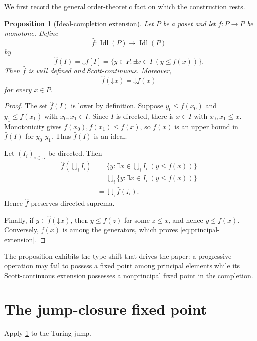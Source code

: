 \documentclass[11pt]{article}
\newtheorem{proposition}[theorem]{Proposition}
\theoremstyle{definition}
\theoremstyle{remark}
\newcommand{\Idl}{\operatorname{Idl}}
\newcommand{\down}{\mathord{\downarrow}}
\begin{document}
We first record the general order-theoretic fact on which the construction rests.

\begin{proposition}[Ideal-completion extension]
\label{prop:ideal-extension}
Let $P$ be a poset and let $f:P\to P$ be monotone. Define
\[
\widehat f:\Idl(P)\to\Idl(P)
\]
by
\begin{equation}
\widehat f(I)
=\down f[I]
=\{y\in P:\exists x\in I\ (y\leq f(x))\}.
\label{eq:ideal-extension}
\end{equation}
Then $\widehat f$ is well defined and Scott-continuous. Moreover,
\begin{equation}
\widehat f(\down x)=\down f(x)
\label{eq:principal-extension}
\end{equation}
for every $x\in P$.
\end{proposition}

\begin{proof}
The set $\widehat f(I)$ is lower by definition. Suppose
$y_0\leq f(x_0)$ and $y_1\leq f(x_1)$ with $x_0,x_1\in I$. Since $I$ is directed, there is $x\in I$ with $x_0,x_1\leq x$. Monotonicity gives $f(x_0),f(x_1)\leq f(x)$, so $f(x)$ is an upper bound in $\widehat f(I)$ for $y_0,y_1$. Thus $\widehat f(I)$ is an ideal.

Let $(I_i)_{i\in D}$ be directed. Then
\begin{align*}
\widehat f\!\left(\bigcup_iI_i\right)
&=\{y:\exists x\in\bigcup_iI_i\ (y\leq f(x))\}\\
&=\bigcup_i\{y:\exists x\in I_i\ (y\leq f(x))\}\\
&=\bigcup_i\widehat f(I_i).
\end{align*}
Hence $\widehat f$ preserves directed suprema.

Finally, if $y\in\widehat f(\down x)$, then $y\leq f(z)$ for some $z\leq x$, and hence $y\leq f(x)$. Conversely, $f(x)$ is among the generators, which proves \eqref{eq:principal-extension}.
\end{proof}

The proposition exhibits the type shift that drives the paper: a progressive operation may fail to possess a fixed point among principal elements while its Scott-continuous extension possesses a nonprincipal fixed point in the completion.

\section{The jump-closure fixed point}

Apply \cref{prop:ideal-extension} to the Turing jump.
\end{document}
